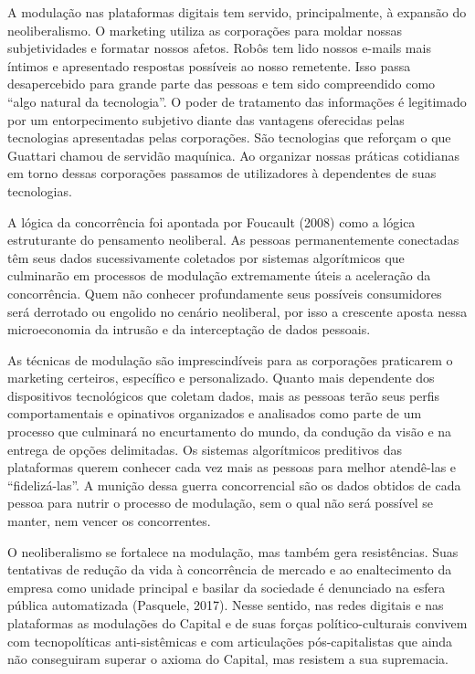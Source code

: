 A modulação nas plataformas digitais tem servido, principalmente, à
expansão do neoliberalismo. O marketing utiliza as corporações para
moldar nossas subjetividades e formatar nossos afetos. Robôs tem lido
nossos e-mails mais íntimos e apresentado respostas possíveis ao nosso
remetente. Isso passa desapercebido para grande parte das pessoas e tem
sido compreendido como ``algo natural da tecnologia''. O poder de
tratamento das informações é legitimado por um entorpecimento subjetivo
diante das vantagens oferecidas pelas tecnologias apresentadas pelas
corporações. São tecnologias que reforçam o que Guattari chamou de
servidão maquínica. Ao organizar nossas práticas cotidianas em torno
dessas corporações passamos de utilizadores à dependentes de suas
tecnologias.

A lógica da concorrência foi apontada por Foucault (2008) como a lógica
estruturante do pensamento neoliberal. As pessoas permanentemente
conectadas têm seus dados sucessivamente coletados por sistemas
algorítmicos que culminarão em processos de modulação extremamente úteis
a aceleração da concorrência. Quem não conhecer profundamente seus
possíveis consumidores será derrotado ou engolido no cenário neoliberal,
por isso a crescente aposta nessa microeconomia da intrusão e da
interceptação de dados pessoais.

As técnicas de modulação são imprescindíveis para as corporações
praticarem o marketing certeiros, específico e personalizado. Quanto
mais dependente dos dispositivos tecnológicos que coletam dados, mais as
pessoas terão seus perfis comportamentais e opinativos organizados e
analisados como parte de um processo que culminará no encurtamento do
mundo, da condução da visão e na entrega de opções delimitadas. Os
sistemas algorítmicos preditivos das plataformas querem conhecer cada
vez mais as pessoas para melhor atendê-las e ``fidelizá-las''. A munição
dessa guerra concorrencial são os dados obtidos de cada pessoa para
nutrir o processo de modulação, sem o qual não será possível se manter,
nem vencer os concorrentes.

O neoliberalismo se fortalece na modulação, mas também gera
resistências. Suas tentativas de redução da vida à concorrência de
mercado e ao enaltecimento da empresa como unidade principal e basilar
da sociedade é denunciado na esfera pública automatizada (Pasquele,
2017). Nesse sentido, nas redes digitais e nas plataformas as modulações
do Capital e de suas forças político-culturais convivem com
tecnopolíticas anti-sistêmicas e com articulações pós-capitalistas que
ainda não conseguiram superar o axioma do Capital, mas resistem a sua
supremacia.

